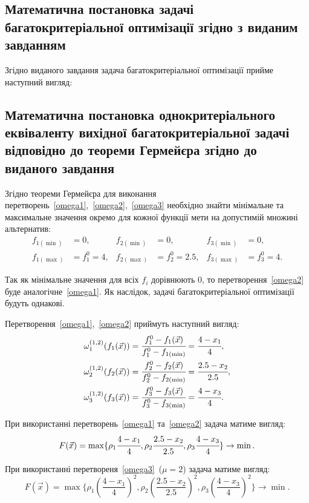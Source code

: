 \subsection{Математична постановка задачі багатокритеріальної оптимізації згідно з виданим завданням}

Згідно виданого завдання задача багатокритеріальної оптимізації прийме наступний вигляд:


\subsection{Математична постановка однокритеріального еквіваленту вихідної багатокритеріальної задачі відповідно до теореми Гермейєра згідно до виданого завдання}

Згідно теореми Гермейєра для виконання перетворень~\eqref{omega1},~\eqref{omega2},~\eqref{omega3} необхідно знайти мінімальне та максимальне значення окремо для кожної функції мети на допустимій множині альтернатив:
\begin{align*}
	f_{1(\min)}&=0,	&	f_{2(\min)}&=0,	&	f_{3(\min)}&=0, \\
	f_{1(\max)}&=f_1^0=4,	&	f_{2(\max)}&=f_2^0=2.5,	&	f_{3(\max)}&=f_3^0=4.
\end{align*}

Так як мінімальне значення для всіх $f_i$ дорівнюють $0$, то перетворення~\eqref{omega2} буде аналогічне~\eqref{omega1}. Як наслідок, задачі багатокритеріальної оптимізації будуть однакові.

Перетворення~\eqref{omega1},~\eqref{omega2} приймуть наступний вигляд:
\begin{align*}
\omega^{(1,2)}_1(f_1(\vec{x})) &= 
\cfrac{f_1^0-f_1(\vec{x})}{f_1^0 - f_{1(\min)}} =
\cfrac{4 - x_1}{4}, \\
\omega^{(1,2)}_2(f_2(\vec{x})) &= 
\cfrac{f_2^0-f_2(\vec{x})}{f_2^0 - f_{2(\min)}} =
\cfrac{2.5 - x_2}{2.5}, \\
\omega^{(1,2)}_3(f_3(\vec{x})) &= 
\cfrac{f_3^0-f_3(\vec{x})}{f_3^0 - f_{3(\min)}} =
\cfrac{4 - x_3}{4}.
\end{align*}

При використанні перетворень~\eqref{omega1} та~\eqref{omega2} задача матиме вигляд:
\[
F(\vec{x})=\max\{ \rho_1\cfrac{4 - x_1}{4},\rho_2\cfrac{2.5 - x_2}{2.5},\rho_3\cfrac{4 - x_3}{4} \} \to \min.
\]

При використанні перетвореня~\eqref{omega3}~($\mu = 2$) задача матиме вигляд:
\[
F(\vec{x})=\max\{ \rho_1\left(\frac{4 - x_1}{4}\right)^2,\rho_2\left(\frac{2.5 - x_2}{2.5}\right)^2,\rho_3\left(\frac{4 - x_3}{4}\right)^2 \} \to \min.
\]

